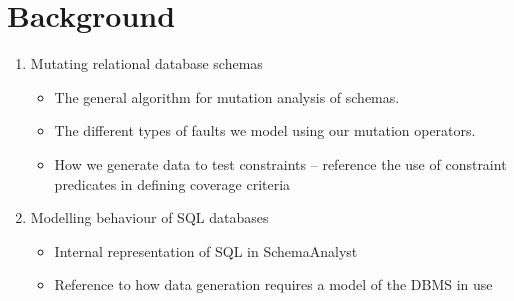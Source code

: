 
\section{Background}
\label{sec:background}

	\begin{enumerate}
		
		\item Mutating relational database schemas

		\begin{itemize}
			
			\item The general algorithm for mutation analysis of schemas.

			\item The different types of faults we model using our mutation operators.

			\item How we generate data to test constraints -- reference the use of constraint predicates in defining coverage criteria 

		\end{itemize}

		\item Modelling behaviour of SQL databases

		\begin{itemize}
			
			\item Internal representation of SQL in SchemaAnalyst

			\item Reference to how data generation requires a model of the DBMS in use

		\end{itemize}

	\end{enumerate}
